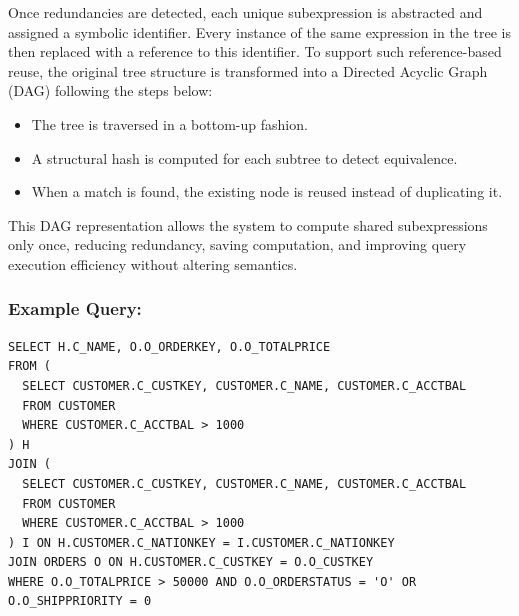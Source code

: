 \documentclass[12pt]{article}
\begin{document}
Once redundancies are detected, each unique subexpression is abstracted and assigned a symbolic identifier. Every instance of the same expression in the tree is then replaced with a reference to this identifier. To support such reference-based reuse, the original tree structure is transformed into a Directed Acyclic Graph (DAG) following the steps below:

\begin{itemize} \item The tree is traversed in a bottom-up fashion. \item A structural hash is computed for each subtree to detect equivalence. \item When a match is found, the existing node is reused instead of duplicating it. \end{itemize}

This DAG representation allows the system to compute shared subexpressions only once, reducing redundancy, saving computation, and improving query execution efficiency without altering semantics.

\subsubsection*{Example Query:}

\begin{verbatim}
SELECT H.C_NAME, O.O_ORDERKEY, O.O_TOTALPRICE 
FROM (
  SELECT CUSTOMER.C_CUSTKEY, CUSTOMER.C_NAME, CUSTOMER.C_ACCTBAL 
  FROM CUSTOMER 
  WHERE CUSTOMER.C_ACCTBAL > 1000
) H
JOIN (
  SELECT CUSTOMER.C_CUSTKEY, CUSTOMER.C_NAME, CUSTOMER.C_ACCTBAL 
  FROM CUSTOMER 
  WHERE CUSTOMER.C_ACCTBAL > 1000
) I ON H.CUSTOMER.C_NATIONKEY = I.CUSTOMER.C_NATIONKEY
JOIN ORDERS O ON H.CUSTOMER.C_CUSTKEY = O.O_CUSTKEY 
WHERE O.O_TOTALPRICE > 50000 AND O.O_ORDERSTATUS = 'O' OR O.O_SHIPPRIORITY = 0
\end{verbatim}

\vspace{1em}
\end{document}
